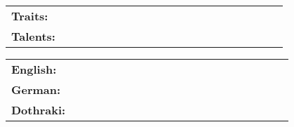 \documentclass[a4paper]{article}
\begin{document}
\vspace*{-40pt}

\vspace*{-10pt}









\vspace{1mm}
\begin{tabular}{l p{0.8\linewidth}}
    \textbf{Traits:} & \\
    \textbf{Talents:} & 
\end{tabular}
\vspace*{8pt}

\vspace{1mm}
\begin{tabular}{l p{0.8\linewidth}}
	\textbf{English:} & \\
    \textbf{German:} & \\
    \textbf{Dothraki:} & 
\end{tabular}
\vspace*{8pt}





%



\end{document}
